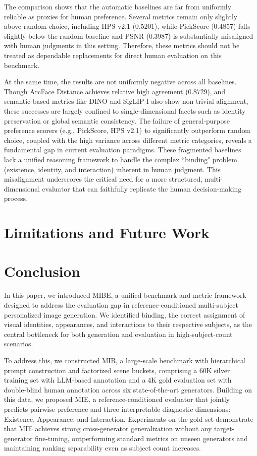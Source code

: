 \documentclass{article}
\begin{document}
The comparison shows that the automatic baselines are far from uniformly reliable as proxies for human preference. Several metrics remain only slightly above random choice, including HPS v2.1 (0.5201), while PickScore (0.4857) falls slightly below the random baseline and PSNR (0.3987) is substantially misaligned with human judgments in this setting. Therefore, these metrics should not be treated as dependable replacements for direct human evaluation on this benchmark.

At the same time, the results are not uniformly negative across all baselines. Though ArcFace Distance achieves relative high agreement (0.8729), and semantic-based metrics like DINO and SigLIP-I also show non-trivial alignment, these successes are largely confined to single-dimensional facets such as identity preservation or global semantic consistency. The failure of general-purpose preference scorers (e.g., PickScore, HPS v2.1) to significantly outperform random choice, coupled with the high variance across different metric categories, reveals a fundamental gap in current evaluation paradigms. These fragmented baselines lack a unified reasoning framework to handle the complex ``binding" problem (existence, identity, and interaction) inherent in human judgment. This misalignment underscores the critical need for a more structured, multi-dimensional evaluator that can faithfully replicate the human decision-making process.

\section{Limitations and Future Work}

\section{Conclusion}
In this paper, we introduced MIBE, a unified benchmark-and-metric framework designed to address the evaluation gap in reference-conditioned multi-subject personalized image generation. We identified binding, the correct assignment of visual identities, appearances, and interactions to their respective subjects, as the central bottleneck for both generation and evaluation in high-subject-count scenarios.

To address this, we constructed MIB, a large-scale benchmark with hierarchical prompt construction and factorized scene buckets, comprising a 60K silver training set with LLM-based annotation and a 4K gold evaluation set with double-blind human annotation across six state-of-the-art generators. Building on this data, we proposed MIE, a reference-conditioned evaluator that jointly predicts pairwise preference and three interpretable diagnostic dimensions: Existence, Appearance, and Interaction. Experiments on the gold set demonstrate that MIE achieves strong cross-generator generalization without any target-generator fine-tuning, outperforming standard metrics on unseen generators and maintaining ranking separability even as subject count increases.
\end{document}
